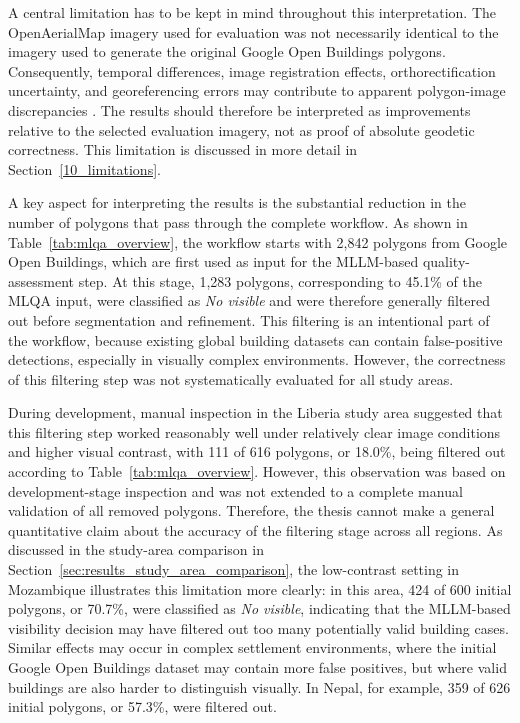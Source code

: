 A central limitation has to be kept in mind throughout this interpretation. The OpenAerialMap imagery used for evaluation was not necessarily identical to the imagery used to generate the original Google Open Buildings polygons. Consequently, temporal differences, image registration effects, orthorectification uncertainty, and georeferencing errors may contribute to apparent polygon-image discrepancies \citep{Toutin01052004}. The results should therefore be interpreted as improvements relative to the selected evaluation imagery, not as proof of absolute geodetic correctness. This limitation is discussed in more detail in Section~\ref{10_limitations}.

A key aspect for interpreting the results is the substantial reduction in the number of polygons that pass through the complete workflow. As shown in Table~\ref{tab:mlqa_overview}, the workflow starts with 2,842 polygons from Google Open Buildings, which are first used as input for the MLLM-based quality-assessment step. At this stage, 1,283 polygons, corresponding to 45.1\% of the MLQA input, were classified as \textit{No visible} and were therefore generally filtered out before segmentation and refinement. This filtering is an intentional part of the workflow, because existing global building datasets can contain false-positive detections, especially in visually complex environments. However, the correctness of this filtering step was not systematically evaluated for all study areas.

During development, manual inspection in the Liberia study area suggested that this filtering step worked reasonably well under relatively clear image conditions and higher visual contrast, with 111 of 616 polygons, or 18.0\%, being filtered out according to Table~\ref{tab:mlqa_overview}. However, this observation was based on development-stage inspection and was not extended to a complete manual validation of all removed polygons. Therefore, the thesis cannot make a general quantitative claim about the accuracy of the filtering stage across all regions. As discussed in the study-area comparison in Section~\ref{sec:results_study_area_comparison}, the low-contrast setting in Mozambique illustrates this limitation more clearly: in this area, 424 of 600 initial polygons, or 70.7\%, were classified as \textit{No visible}, indicating that the MLLM-based visibility decision may have filtered out too many potentially valid building cases. Similar effects may occur in complex settlement environments, where the initial Google Open Buildings dataset may contain more false positives, but where valid buildings are also harder to distinguish visually. In Nepal, for example, 359 of 626 initial polygons, or 57.3\%, were filtered out.

